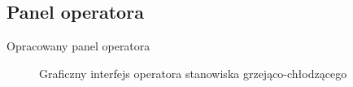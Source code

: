 \subsection{Panel operatora}
\label{lab:zad5}

Opracowany panel operatora

\ifdefined\CompileImages
    \begin{figure}[H]      
        \caption{Graficzny interfejs operatora stanowiska grzejąco-chłodzącego}
    \end{figure}
\fi


